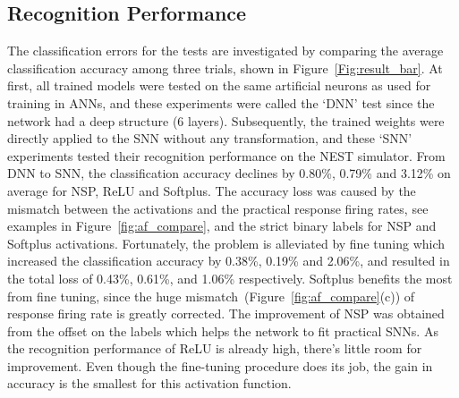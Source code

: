 \documentclass[10pt,journal,compsoc]{IEEEtran}
\begin{document}
	\subsection{Recognition Performance}
	\label{subsec:result_compare}
	The classification errors for the tests are investigated by comparing the average classification accuracy among three trials, shown in Figure~\ref{Fig:result_bar}.
	At first, all trained models were tested on the same artificial neurons as used for training in ANNs, and these experiments were called the `DNN' test since the network had a deep structure (6 layers).
	Subsequently, the trained weights were directly applied to the SNN without any transformation, and these `SNN' experiments tested their recognition performance on the NEST simulator.
	From DNN to SNN, the classification accuracy declines by 0.80\%, 0.79\% and 3.12\% on average for NSP, ReLU and Softplus.
	The accuracy loss was caused by the mismatch between the activations and the practical response firing rates, see examples in Figure~\ref{fig:af_compare}, and the strict binary labels for NSP and Softplus activations.
	Fortunately, the problem is alleviated by fine tuning which increased the classification accuracy by 0.38\%, 0.19\% and 2.06\%, and resulted in the total loss of 0.43\%, 0.61\%, and 1.06\% respectively.
	Softplus benefits the most from fine tuning, since the huge mismatch~(Figure~\ref{fig:af_compare}(c)) of response firing rate is greatly corrected.
	The improvement of NSP was obtained from the offset on the labels which helps the network to fit practical SNNs.
	As the recognition performance of ReLU is already high, there's little room for improvement.
	Even though the fine-tuning procedure does its job, the gain in accuracy is the smallest for this activation function.
	
	

	
\end{document}
